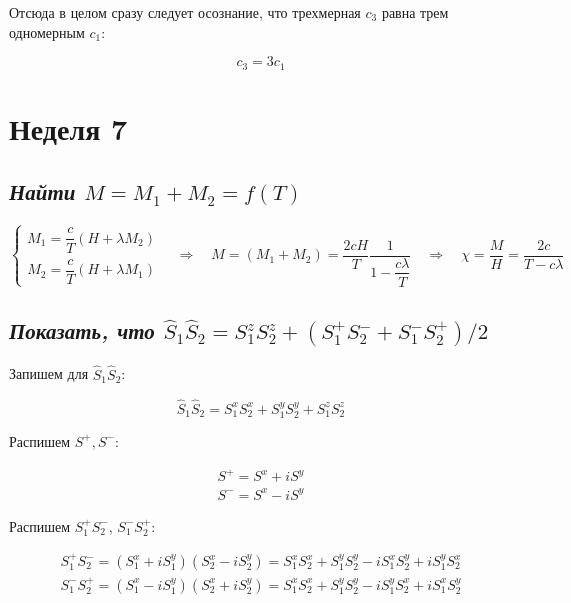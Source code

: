 \documentclass[a4paper, 12pt]{article}
\newcommand{\qrq}
{\ensuremath{\quad \Rightarrow \quad}} %
\begin{document}
Отсюда в целом сразу следует осознание, что трехмерная $c_3$ равна трем одномерным $c_1$:

\begin{equation}
	c_3 = 3 c_1
\end{equation} 

\newpage

\section{Неделя 7}

\subsection{\textit{Найти $M = M_1 + M_2 = f(T)$}}

\begin{equation}
	\begin{cases*}
		M_1 = \dfrac{c}{T}(H + \lambda M_2)\\
		M_2 = \dfrac{c}{T}(H + \lambda M_1)
	\end{cases*}
	\qrq M = (M_1 + M_2) = \frac{2 c H}{T} \frac{1}{1 - \dfrac{c\lambda}{T}} \qrq \chi = \frac{M}{H} = \frac{2c}{T - c\lambda}
\end{equation}

\subsection{\textit{Показать, что $\hat{S}_1 \hat{S}_2 = S_1^z S_2^z + (S_1^+S_2^- + S_1^-S_2^+)/2$}}

Запишем для $\hat{S}_1 \hat{S}_2$:

\begin{equation}
	\hat{S}_1 \hat{S}_2 = S_1^x S_2^x + S_1^y S_2^y + S_1^z S_2^z
	\label{eq:7_ss}
\end{equation}

Распишем $S^+, S^-$:

\begin{align}
	S^+ = S^x + i S^y\\
	S^- = S^x - i S^y
\end{align}

Распишем $S_1^+S_2^-$, $S_1^-S_2^+$:

\begin{align}
	S_1^+S_2^- = (S_1^x + iS_1^y)(S_2^x - iS_2^y) = S_1^x S_2^x + S_1^yS_2^y - i S_1^x S_2^y + i S_1^y S_2^x\\
	S_1^-S_2^+ = (S_1^x - iS_1^y)(S_2^x + iS_2^y) = S_1^x S_2^x + S_1^yS_2^y - i S_1^y S_2^x + i S_1^x S_2^y
\end{align}
\end{document}
